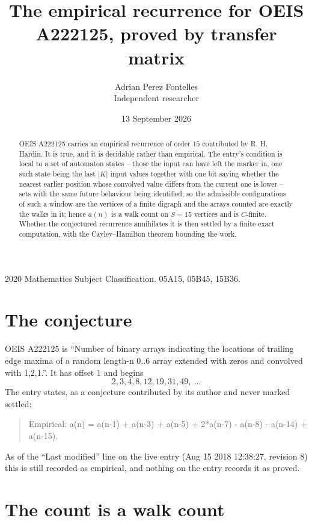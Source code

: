 \documentclass[11pt,a4paper]{article}
\title{The empirical recurrence for OEIS A222125, proved by transfer matrix}
\author{Adrian Perez Fontelles\\ \small Independent researcher}
\date{13 September 2026}
\theoremstyle{plain}
\theoremstyle{definition}
\begin{document}
\maketitle

\begin{abstract}
OEIS A222125 carries an empirical recurrence of order $15$ contributed by R. H. Hardin. It is
true, and it is decidable rather than empirical. The entry's condition is local to a set of automaton states -- those the input can have left the marker in, one such state being the last $|K|$ input values together with one bit saying whether the nearest earlier position whose convolved value differs from the current one is lower -- sets with the same future behaviour being identified, so
the admissible configurations of such a window are the vertices of a finite digraph and the
arrays counted are exactly the walks in it; hence $a(n)$ is a walk count on $S=15$ vertices
and is $C$-finite. Whether the conjectured recurrence annihilates it is then settled by a
finite exact computation, with the Cayley--Hamilton theorem bounding the work.
\end{abstract}

\noindent\small 2020 Mathematics Subject Classification. 05A15, 05B45, 15B36.\normalsize

\section{The conjecture}

OEIS A222125 is ``Number of binary arrays indicating the locations of trailing edge maxima of a random length-n 0..6 array extended with zeros and convolved with 1,2,1.''. It has offset $1$ and begins
\[
2, 3, 4, 8, 12, 19, 31, 49,\ \dots
\]
The entry states, as a conjecture contributed by its author and never marked settled:
\begin{quote}
Empirical: a(n) = a(n-1) + a(n-3) + a(n-5) + 2*a(n-7) - a(n-8) - a(n-14) + a(n-15).
\end{quote}
As of the ``Last modified'' line on the live entry (Aug 15 2018 12:38:27, revision 8) this is still
recorded as empirical, and nothing on the entry records it as proved.

\section{The count is a walk count}
\end{document}
